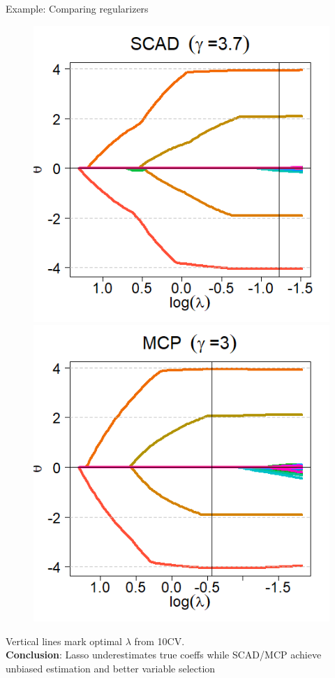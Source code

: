 \documentclass[11pt,compress,t,notes=noshow, xcolor=table]{beamer}
\begin{document}
\begin{vbframe}{Example: Comparing regularizers}
\begin{figure}[h]
\begin{minipage}{0.32\linewidth}
      \centerline{\includegraphics[width=\textwidth]{figure_man/other-pen-SCAD.png}}
    \end{minipage}
    \begin{minipage}{0.32\linewidth}
      \vspace{3pt}
      \centerline{\includegraphics[width=\textwidth]{figure_man/other-pen-MCP.png}}
    \end{minipage}
  \end{figure}
Vertical lines mark optimal $\lambda$ from 10CV.\\
\textbf{Conclusion}: Lasso underestimates true coeffs while SCAD/MCP achieve unbiased estimation and better variable selection


\end{vbframe}
\end{document}
